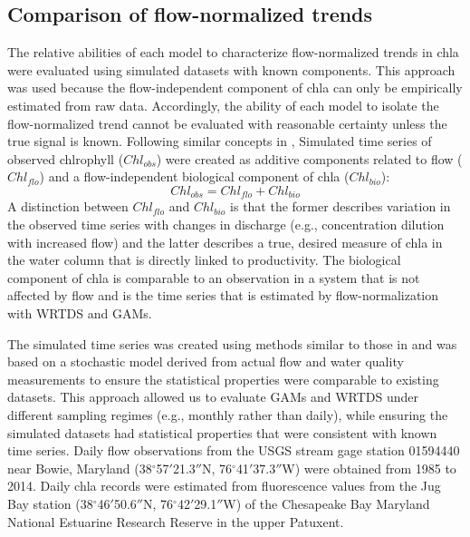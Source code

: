 \documentclass[letterpaper,12pt,oneside]{article}\usepackage[]{graphicx}\usepackage[]{color}
\begin{document}
\subsection*{Comparison of flow-normalized trends}

The relative abilities of each model to characterize flow-normalized trends in \ac{chla} were evaluated using simulated datasets with known components.  This approach was used because the flow-independent component of \ac{chla} can only be empirically estimated from raw data.  Accordingly, the ability of each model to isolate the flow-normalized trend cannot be evaluated with reasonable certainty unless the true signal is known.  Following similar concepts in \citet{Beck15b}, Simulated time series of observed chlrophyll ($Chl_{obs}$) were created as additive components related to flow ($Chl_{flo}$) and a flow-independent biological component of \ac{chla} ($Chl_{bio}$):
\begin{equation} \label{chlobs}
Chl_{obs} = Chl_{flo} + Chl_{bio}
\end{equation}
A distinction between $Chl_{flo}$ and $Chl_{bio}$ is that the former describes variation in the observed time series with changes in discharge (e.g., concentration dilution with increased flow) and the latter describes a true, desired measure of \ac{chla} in the water column that is directly linked to productivity.  The biological component of \ac{chla} is comparable to an observation in a system that is not affected by flow and is the time series that is estimated by flow-normalization with \ac{WRTDS} and \acp{GAM}.

The simulated time series was created using methods similar to those in \citet{Hirsch15} and was based on a stochastic model derived from actual flow and water quality measurements to ensure the statistical properties were comparable to existing datasets.  This approach allowed us to evaluate \acp{GAM} and \ac{WRTDS} under different sampling regimes (e.g., monthly rather than daily), while ensuring the simulated datasets had statistical properties that were consistent with known time series. Daily flow observations from the \ac{USGS} stream gage station 01594440 near Bowie, Maryland (38$^{\circ}$57$'$21.3$''$N, 76$^{\circ}$41$'$37.3$''$W) were obtained from 1985 to 2014.  Daily \ac{chla} records were estimated from fluorescence values from the Jug Bay station (38$^{\circ}$46$'$50.6$''$N, 76$^{\circ}$42$'$29.1$''$W) of the Chesapeake Bay Maryland National Estuarine Research Reserve in the upper Patuxent.
\end{document}
